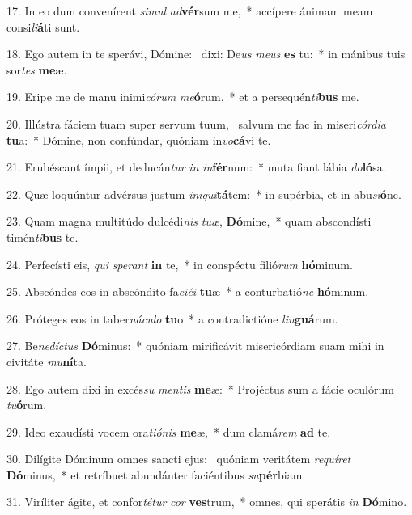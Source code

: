 17. In eo dum convenírent \textit{si}\textit{mul} \textit{ad}\textbf{vér}sum me,~*  accípere ánimam meam consi\textit{li}\textbf{á}ti sunt.\

18. Ego autem in te sperávi, Dómine: \dag\  dixi: De\textit{us} \textit{me}\textit{us} \textbf{es} tu:~*  in mánibus tuis sor\textit{tes} \textbf{me}æ.\

19. Eripe me de manu inimi\textit{có}\textit{rum} \textit{me}\textbf{ó}rum,~*  et a persequén\textit{ti}\textbf{bus} me.\

20. Illústra fáciem tuam super servum tuum, \dag\  salvum me fac in miseri\textit{cór}\textit{di}\textit{a} \textbf{tu}a:~*  Dómine, non confúndar, quóniam in\textit{vo}\textbf{cá}vi te.\

21. Erubéscant ímpii, et deducán\textit{tur} \textit{in} \textit{in}\textbf{fér}num:~*  muta fiant lábia \textit{do}\textbf{ló}sa.\

22. Quæ loquúntur advérsus justum \textit{in}\textit{i}\textit{qui}\textbf{tá}tem:~*  in supérbia, et in abu\textit{si}\textbf{ó}ne.\

23. Quam magna multitúdo dulcédi\textit{nis} \textit{tu}\textit{æ}, \textbf{Dó}mine,~*  quam abscondísti timén\textit{ti}\textbf{bus} te.\

24. Perfecísti eis, \textit{qui} \textit{spe}\textit{rant} \textbf{in} te,~*  in conspéctu filió\textit{rum} \textbf{hó}minum.\

25. Abscóndes eos in abscóndito fa\textit{ci}\textit{é}\textit{i} \textbf{tu}æ~*  a conturbatió\textit{ne} \textbf{hó}minum.\

26. Próteges eos in taber\textit{ná}\textit{cu}\textit{lo} \textbf{tu}o~*  a contradictióne \textit{lin}\textbf{guá}rum.\

27. Be\textit{ne}\textit{díc}\textit{tus} \textbf{Dó}minus:~*  quóniam mirificávit misericórdiam suam mihi in civitáte \textit{mu}\textbf{ní}ta.\

28. Ego autem dixi in excés\textit{su} \textit{men}\textit{tis} \textbf{me}æ:~*  Projéctus sum a fácie oculórum \textit{tu}\textbf{ó}rum.\

29. Ideo exaudísti vocem ora\textit{ti}\textit{ó}\textit{nis} \textbf{me}æ,~*  dum clamá\textit{rem} \textbf{ad} te.\

30. Dilígite Dóminum omnes sancti ejus: \dag\  quóniam veritátem \textit{re}\textit{quí}\textit{ret} \textbf{Dó}minus,~*  et retríbuet abundánter faciéntibus \textit{su}\textbf{pér}biam.\

31. Viríliter ágite, et confor\textit{té}\textit{tur} \textit{cor} \textbf{ves}trum,~*  omnes, qui sperátis \textit{in} \textbf{Dó}mino.\

